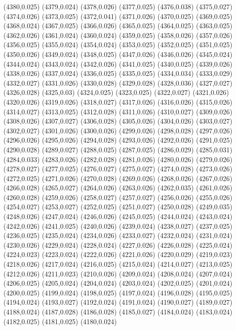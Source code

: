 (4380,0.025)
(4379,0.024)
(4378,0.026)
(4377,0.025)
(4376,0.038)
(4375,0.027)
(4374,0.026)
(4373,0.025)
(4372,0.041)
(4371,0.026)
(4370,0.025)
(4369,0.025)
(4368,0.024)
(4367,0.025)
(4366,0.026)
(4365,0.025)
(4364,0.025)
(4363,0.025)
(4362,0.026)
(4361,0.024)
(4360,0.024)
(4359,0.025)
(4358,0.026)
(4357,0.026)
(4356,0.025)
(4355,0.024)
(4354,0.024)
(4353,0.025)
(4352,0.025)
(4351,0.025)
(4350,0.026)
(4349,0.024)
(4348,0.025)
(4347,0.026)
(4346,0.026)
(4345,0.024)
(4344,0.024)
(4343,0.024)
(4342,0.026)
(4341,0.025)
(4340,0.025)
(4339,0.026)
(4338,0.026)
(4337,0.024)
(4336,0.025)
(4335,0.025)
(4334,0.034)
(4333,0.029)
(4332,0.027)
(4331,0.026)
(4330,0.028)
(4329,0.028)
(4328,0.036)
(4327,0.027)
(4326,0.028)
(4325,0.03)
(4324,0.025)
(4323,0.025)
(4322,0.027)
(4321,0.026)
(4320,0.026)
(4319,0.026)
(4318,0.027)
(4317,0.026)
(4316,0.026)
(4315,0.026)
(4314,0.027)
(4313,0.025)
(4312,0.028)
(4311,0.026)
(4310,0.027)
(4309,0.026)
(4308,0.026)
(4307,0.027)
(4306,0.028)
(4305,0.026)
(4304,0.026)
(4303,0.027)
(4302,0.027)
(4301,0.026)
(4300,0.026)
(4299,0.026)
(4298,0.028)
(4297,0.026)
(4296,0.026)
(4295,0.026)
(4294,0.028)
(4293,0.026)
(4292,0.026)
(4291,0.025)
(4290,0.028)
(4289,0.027)
(4288,0.025)
(4287,0.025)
(4286,0.029)
(4285,0.031)
(4284,0.033)
(4283,0.026)
(4282,0.028)
(4281,0.026)
(4280,0.026)
(4279,0.026)
(4278,0.027)
(4277,0.025)
(4276,0.027)
(4275,0.027)
(4274,0.028)
(4273,0.026)
(4272,0.025)
(4271,0.026)
(4270,0.028)
(4269,0.026)
(4268,0.026)
(4267,0.026)
(4266,0.028)
(4265,0.027)
(4264,0.026)
(4263,0.026)
(4262,0.035)
(4261,0.026)
(4260,0.028)
(4259,0.026)
(4258,0.027)
(4257,0.027)
(4256,0.026)
(4255,0.026)
(4254,0.027)
(4253,0.027)
(4252,0.025)
(4251,0.027)
(4250,0.028)
(4249,0.035)
(4248,0.026)
(4247,0.024)
(4246,0.026)
(4245,0.025)
(4244,0.024)
(4243,0.024)
(4242,0.026)
(4241,0.025)
(4240,0.026)
(4239,0.024)
(4238,0.027)
(4237,0.025)
(4236,0.025)
(4235,0.024)
(4234,0.026)
(4233,0.027)
(4232,0.024)
(4231,0.024)
(4230,0.026)
(4229,0.024)
(4228,0.024)
(4227,0.026)
(4226,0.028)
(4225,0.024)
(4224,0.023)
(4223,0.024)
(4222,0.026)
(4221,0.026)
(4220,0.029)
(4219,0.023)
(4218,0.026)
(4217,0.024)
(4216,0.025)
(4215,0.024)
(4214,0.027)
(4213,0.025)
(4212,0.026)
(4211,0.023)
(4210,0.026)
(4209,0.024)
(4208,0.024)
(4207,0.024)
(4206,0.025)
(4205,0.024)
(4204,0.024)
(4203,0.024)
(4202,0.025)
(4201,0.024)
(4200,0.025)
(4199,0.024)
(4198,0.025)
(4197,0.024)
(4196,0.028)
(4195,0.025)
(4194,0.024)
(4193,0.027)
(4192,0.024)
(4191,0.024)
(4190,0.027)
(4189,0.027)
(4188,0.024)
(4187,0.028)
(4186,0.028)
(4185,0.027)
(4184,0.024)
(4183,0.024)
(4182,0.025)
(4181,0.025)
(4180,0.024)
